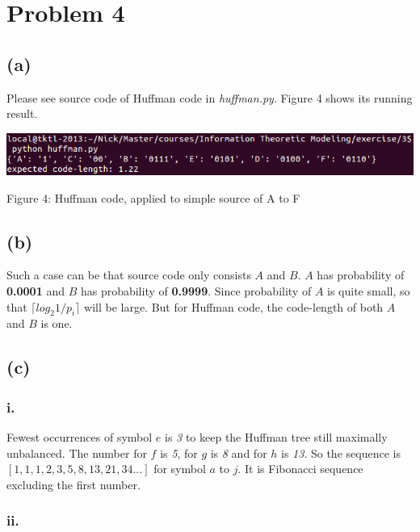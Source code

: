 \documentclass{article}
\begin{document}
\section{Problem 4}

\subsection*{(a)}

Please see source code of Huffman code in \emph{huffman.py}. Figure 4 shows its running result.

\vspace{5mm}
\begin{minipage}{0.9\textwidth}
  \includegraphics[width=\textwidth,keepaspectratio]{4.png}
  \centerline{Figure 4: Huffman code, applied to simple source of A to F}
\end{minipage}

\subsection*{(b)}

Such a case can be that source code only consists $A$ and $B$. $A$ has probability of \textbf{0.0001} and $B$ has probability of \textbf{0.9999}. Since probability of $A$ is quite small, so that $\lceil{log_2 1/p_i}\rceil$ will be large. But for Huffman code, the code-length of both $A$ and $B$ is one.

\subsection*{(c)}

\subsubsection*{i.}

Fewest occurrences of symbol $e$ is \emph{3} to keep the Huffman tree still maximally unbalanced. The number for $f$ is \emph{5}, for $g$ is \emph{8} and for $h$ is \emph{13}. So the sequence is $[1, 1, 1, 2, 3, 5, 8, 13, 21, 34...]$ for symbol $a$ to $j$. It is Fibonacci sequence excluding the first number.

\subsubsection*{ii.}
\end{document}
